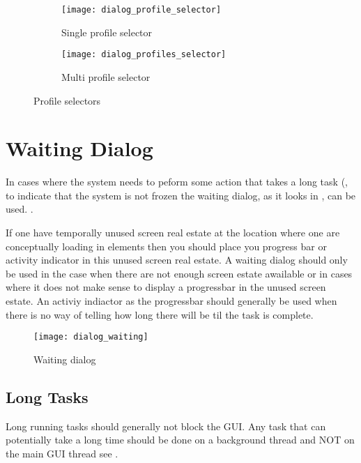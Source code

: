 \begin{figure}[!htbp]
    \centering
    \begin{subfigure}[t]{0.4\textwidth}
    	\centering
        \texttt{[image: dialog\_profile\_selector]}
        \caption{Single profile selector}
        \label{fig:profile_selector_dialog}
    \end{subfigure}
    \hspace{5em}
    \begin{subfigure}[t]{0.4\textwidth}
    	\centering
        \texttt{[image: dialog\_profiles\_selector]}
        \caption{Multi profile selector}
        \label{fig:profiles_selector_dialog}
    \end{subfigure}
    
    \caption{Profile selectors}
    \label{fig:profile_selection}
\end{figure}

\section{Waiting Dialog}
\label{sec:waiting_dialog}

In cases where the system needs to peform some action that takes a long task (, to indicate that the system is not frozen the waiting dialog, as it looks in , can be used. .

\begin{note}
	If one have temporally unused screen real estate at the location where one are conceptually loading in elements then you should place you progress bar or activity indicator in this unused screen real estate. A waiting dialog should only be used in the case when there are not enough screen estate awailable or in cases where it does not make sense to display a progressbar in the unused screen estate. An activiy indiactor as the progressbar should generally be used when there is no way of telling how long there will be til the task is complete. 
\end{note}


\begin{figure}[h]
	\centering
	\texttt{[image: dialog\_waiting]}
	\caption{Waiting dialog}
	\label{fig:dialog_waiting}
\end{figure}
\FloatBarrier

\subsection{Long Tasks}
\label{sub:long_tasks}
Long running tasks should generally not block the GUI. Any task that can potentially take a long time should be done on a background thread and NOT on the main GUI thread see . 


